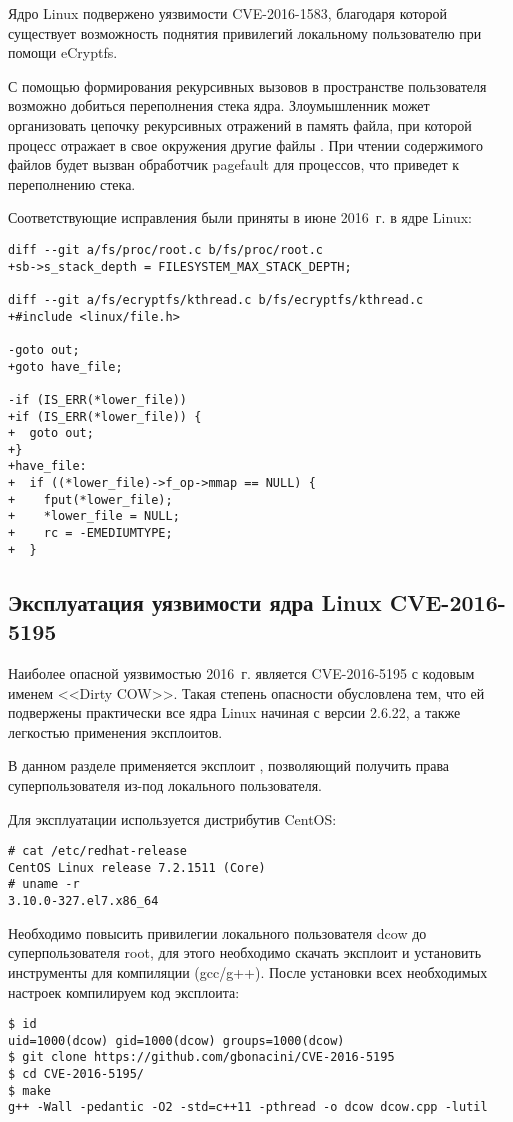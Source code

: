 Ядро Linux подвержено уязвимости CVE-2016-1583, благодаря которой существует возможность поднятия привилегий локальному пользователю при помощи eCryptfs.

С помощью формирования рекурсивных вызовов в пространстве пользователя возможно добиться переполнения стека ядра.
Злоумышленник может организовать цепочку рекурсивных отражений в память файла, при которой процесс отражает в свое окружения другие файлы \cite{ecryptfs}.
При чтении содержимого файлов будет вызван обработчик pagefault для процессов, что приведет к переполнению стека.

Соответствующие исправления были приняты в июне 2016~г. в ядре Linux:
\begin{lstlisting}
diff --git a/fs/proc/root.c b/fs/proc/root.c
+sb->s_stack_depth = FILESYSTEM_MAX_STACK_DEPTH;

diff --git a/fs/ecryptfs/kthread.c b/fs/ecryptfs/kthread.c
+#include <linux/file.h>

-goto out;
+goto have_file;

-if (IS_ERR(*lower_file))
+if (IS_ERR(*lower_file)) {
+  goto out;
+}
+have_file:
+  if ((*lower_file)->f_op->mmap == NULL) {
+    fput(*lower_file);
+    *lower_file = NULL;
+    rc = -EMEDIUMTYPE;
+  }
\end{lstlisting}


\subsection{Эксплуатация уязвимости ядра Linux CVE-2016-5195}

Наиболее опасной уязвимостью 2016~г. является CVE-2016-5195 с кодовым именем <<Dirty COW>>.
Такая степень опасности обусловлена тем, что ей подвержены практически все ядра Linux начиная с версии 2.6.22, а также легкостью применения эксплоитов.

В данном разделе применяется эксплоит \cite{dcowexp}, позволяющий получить права суперпользователя из-под локального пользователя.

Для эксплуатации используется дистрибутив CentOS:
\begin{lstlisting}
# cat /etc/redhat-release
CentOS Linux release 7.2.1511 (Core)
# uname -r
3.10.0-327.el7.x86_64
\end{lstlisting}

Необходимо повысить привилегии локального пользователя dcow до суперпользователя root, для этого необходимо скачать эксплоит и установить инструменты для компиляции (gcc/g++).
После установки всех необходимых настроек компилируем код эксплоита:
\begin{lstlisting}
$ id
uid=1000(dcow) gid=1000(dcow) groups=1000(dcow)
$ git clone https://github.com/gbonacini/CVE-2016-5195
$ cd CVE-2016-5195/
$ make
g++ -Wall -pedantic -O2 -std=c++11 -pthread -o dcow dcow.cpp -lutil
\end{lstlisting}

